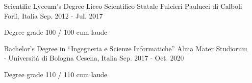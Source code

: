 

\begin{cventries}

  \cventry
  {Scientific Lyceum's Degree} %
  {Liceo Scientifico Statale Fulcieri Paulucci di Calboli} %
  {Forlì, Italia} %
  {Sep. 2012 - Jul. 2017} %
  {
    \begin{cvitems} %
      \item {Degree grade 100 / 100 cum laude}
    \end{cvitems}
  }

  \cventry
    {Bachelor's Degree in ``Ingegneria e Scienze Informatiche''} %
    {Alma Mater Studiorum - Università di Bologna} %
    {Cesena, Italia} %
    {Sep. 2017 - Oct. 2020} %
    {
      \begin{cvitems} %
        \item {Degree grade 110 / 110 cum laude}
      \end{cvitems}
    }

\end{cventries}
